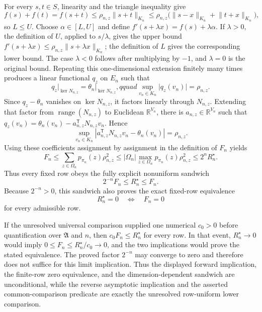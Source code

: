 For every \(s,t\in S\), linearity and the triangle inequality give
\[
 f(s)+f(t)=f(s+t)
 \le\rho_{n,z}\lVert s+t\rVert_{K_n}
 \le\rho_{n,z}\bigl(\lVert s-x\rVert_{K_n}+\lVert t+x\rVert_{K_n}\bigr),
\]
so \(L\le U\). Choose \(\alpha\in[L,U]\) and define \(f'(s+\lambda x)=f(s)+\lambda\alpha\). If \(\lambda>0\), the definition of \(U\), applied to \(s/\lambda\), gives the upper bound \(f'(s+\lambda x)\le\rho_{n,z}\lVert s+\lambda x\rVert_{K_n}\); the definition of \(L\) gives the corresponding lower bound. The case \(\lambda<0\) follows after multiplying by \(-1\), and \(\lambda=0\) is the original bound. Repeating this one-dimensional extension finitely many times produces a linear functional \(q_z\) on \(E_n\) such that
\[
 q_z\big|_{\ker N_{n,z}}=\theta_n\big|_{\ker N_{n,z}},qquad
 \sup_{v_n\in K_n}\lvert q_z(v_n)\rvert=\rho_{n,z}.
\]
Since \(q_z-\theta_n\) vanishes on \(\ker N_{n,z}\), it factors linearly through \(N_{n,z}\). Extending that factor from \(\operatorname{range}(N_{n,z})\) to Euclidean \(\mathbb R^{V_n}\), there is \(a_{n,z}\in\mathbb R^{V_n}\) such that \(q_z(v_n)=\theta_n(v_n)-a_{n,z}^{\mathsf T}N_{n,z}v_n\). Hence
\[
 \sup_{v_n\in K_n}\left\lvert a_{n,z}^{\mathsf T}N_{n,z}v_n-\theta_n(v_n)\right\rvert
 =\rho_{n,z}.
\]
Using these coefficients assignment by assignment in the definition of \(F_n\) yields
\[
 F_n\le\sum_{z\in\Omega_n}p_{\pi_n}(z)\rho_{n,z}^2
 \le\lvert\Omega_n\rvert\max_{z\in\Omega_n}p_{\pi_n}(z)\rho_{n,z}^2
 \le2^nR_n^{\star}.
\]
Thus every fixed row obeys the fully explicit nonuniform sandwich
\[
 2^{-n}F_n\le R_n^{\star}\le F_n.
\]
Because \(2^{-n}>0\), this sandwich also proves the exact fixed-row equivalence
\[
 R_n^{\star}=0\quad\Longleftrightarrow\quad F_n=0
\]
for every admissible row.

If the unresolved universal comparison supplied one numerical \(c_0>0\) before quantification over \(\mathfrak A\) and \(n\), then \(c_0F_n\le R_n^{\star}\) for every row. In that event, \(R_n^{\star}\to0\) would imply \(0\le F_n\le R_n^{\star}/c_0\to0\), and the two implications would prove the stated equivalence. The proved factor \(2^{-n}\) may converge to zero and therefore does not suffice for this limit implication. Thus the displayed forward implication, the finite-row zero equivalence, and the dimension-dependent sandwich are unconditional, while the reverse asymptotic implication and the asserted common-comparison predicate are exactly the unresolved row-uniform lower comparison.